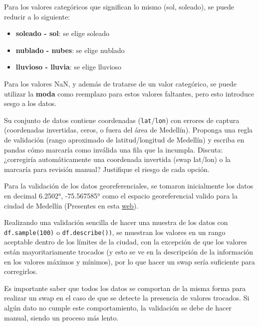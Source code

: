 \documentclass[11pt]{article}
\begin{document}
Para los valores categóricos que significan lo mismo (sol, soleado), se puede reducir a lo siguiente:

\begin{itemize}
    \item \textbf{soleado - sol}: se elige soleado
    \item \textbf{nublado - nubes}: se elige nublado
    \item \textbf{lluvioso - lluvia}: se elige lluvioso
\end{itemize}

Para los valores NaN, y además de tratarse de un valor categórico, se puede utilizar la \textbf{moda} como reemplazo para estos valores faltantes, pero esto introduce sesgo a los datos.


\begin{pregunta}
Su conjunto de datos contiene coordenadas (\texttt{lat}/\texttt{lon}) con errores de captura (coordenadas invertidas, ceros, o fuera del área de Medellín). Proponga una regla de validación (rango aproximado de latitud/longitud de Medellín) y escriba en pandas cómo marcaría como inválida una fila que la incumpla. Discuta: ¿corregiría automáticamente una coordenada invertida (swap lat/lon) o la marcaría para revisión manual? Justifique el riesgo de cada opción.
\end{pregunta}

Para la validación de los datos georeferenciales, se tomaron inicialmente los datos en decimal    6.2502°, -75.567585° como el espacio georeferencial valido para la ciudad de Medellín (Presentes en esta \href{https://geohack.toolforge.org/geohack.php?language=es&pagename=Medell%C3%ADn&params=6.250200154879_N_-75.567584500697_E_type:city}{web}).

Realizando una validación sencilla de hacer una muestra de los datos con \verb|df.sample(100)| o \verb|df.describe())|, se muestran los valores en un rango aceptable dentro de los límites de la ciudad, con la excepción de que los valores están mayoritariamente trocados (y esto se ve en la descripción de la información en los valores máximos y mínimos), por lo que hacer un swap sería suficiente para corregirlos.

Es importante saber que todos los datos se comportan de la misma forma para realizar un swap en el caso de que se detecte la presencia de valores trocados. Si algún dato no cumple este comportamiento, la validación se debe de hacer manual, siendo un proceso más lento.
\end{document}
